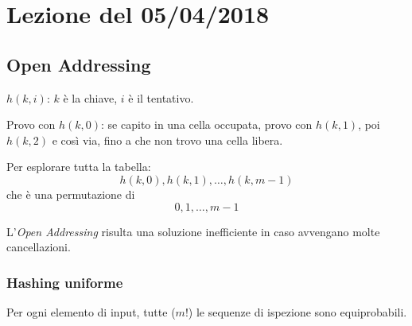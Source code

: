 \section{Lezione del 05/04/2018}

\subsection{Open Addressing} \label{hash:openaddessing}

$h(k,i)$: $k$ è la chiave, $i$ è il tentativo.\par
Provo con $h(k,0)$: se capito in una cella occupata, provo con $h(k,1)$, poi $h(k,2)$
e così via, fino a che non trovo una cella libera.

Per esplorare tutta la tabella:
$$h(k,0), h(k,1), \dots, h(k,m-1)$$
che è una permutazione di 
$$0,1,\dots,m-1$$




L'\emph{Open Addressing} risulta una soluzione inefficiente in caso
avvengano molte cancellazioni.

\subsubsection{Hashing uniforme}

Per ogni elemento di input, tutte ($m!$) le sequenze di ispezione
sono equiprobabili.

